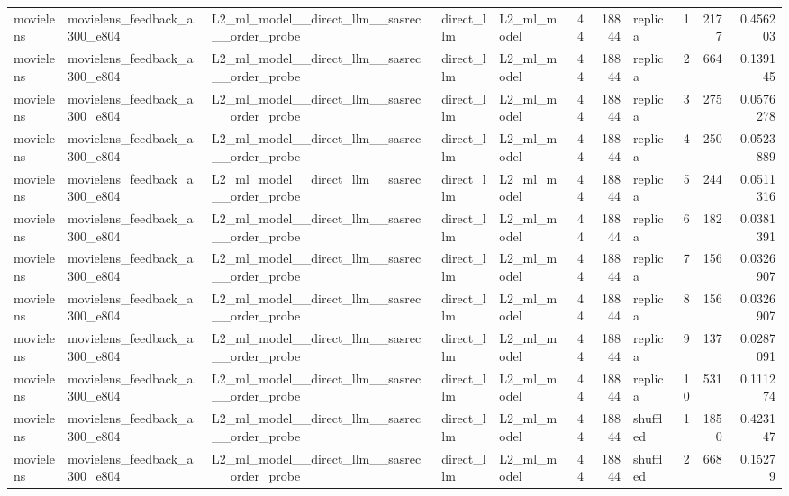 \begin{table}[htbp!]
\begin{tabular}{lllllrrlrrr}
movielens & movielens\_feedback\_a300\_e804 & L2\_ml\_model\_\_direct\_llm\_\_sasrec\_\_order\_probe & direct\_llm & L2\_ml\_model & 44 & 18844 & replica & 1 & 2177 & 0.456203 \\
movielens & movielens\_feedback\_a300\_e804 & L2\_ml\_model\_\_direct\_llm\_\_sasrec\_\_order\_probe & direct\_llm & L2\_ml\_model & 44 & 18844 & replica & 2 & 664 & 0.139145 \\
movielens & movielens\_feedback\_a300\_e804 & L2\_ml\_model\_\_direct\_llm\_\_sasrec\_\_order\_probe & direct\_llm & L2\_ml\_model & 44 & 18844 & replica & 3 & 275 & 0.0576278 \\
movielens & movielens\_feedback\_a300\_e804 & L2\_ml\_model\_\_direct\_llm\_\_sasrec\_\_order\_probe & direct\_llm & L2\_ml\_model & 44 & 18844 & replica & 4 & 250 & 0.0523889 \\
movielens & movielens\_feedback\_a300\_e804 & L2\_ml\_model\_\_direct\_llm\_\_sasrec\_\_order\_probe & direct\_llm & L2\_ml\_model & 44 & 18844 & replica & 5 & 244 & 0.0511316 \\
movielens & movielens\_feedback\_a300\_e804 & L2\_ml\_model\_\_direct\_llm\_\_sasrec\_\_order\_probe & direct\_llm & L2\_ml\_model & 44 & 18844 & replica & 6 & 182 & 0.0381391 \\
movielens & movielens\_feedback\_a300\_e804 & L2\_ml\_model\_\_direct\_llm\_\_sasrec\_\_order\_probe & direct\_llm & L2\_ml\_model & 44 & 18844 & replica & 7 & 156 & 0.0326907 \\
movielens & movielens\_feedback\_a300\_e804 & L2\_ml\_model\_\_direct\_llm\_\_sasrec\_\_order\_probe & direct\_llm & L2\_ml\_model & 44 & 18844 & replica & 8 & 156 & 0.0326907 \\
movielens & movielens\_feedback\_a300\_e804 & L2\_ml\_model\_\_direct\_llm\_\_sasrec\_\_order\_probe & direct\_llm & L2\_ml\_model & 44 & 18844 & replica & 9 & 137 & 0.0287091 \\
movielens & movielens\_feedback\_a300\_e804 & L2\_ml\_model\_\_direct\_llm\_\_sasrec\_\_order\_probe & direct\_llm & L2\_ml\_model & 44 & 18844 & replica & 10 & 531 & 0.111274 \\
movielens & movielens\_feedback\_a300\_e804 & L2\_ml\_model\_\_direct\_llm\_\_sasrec\_\_order\_probe & direct\_llm & L2\_ml\_model & 44 & 18844 & shuffled & 1 & 1850 & 0.423147 \\
movielens & movielens\_feedback\_a300\_e804 & L2\_ml\_model\_\_direct\_llm\_\_sasrec\_\_order\_probe & direct\_llm & L2\_ml\_model & 44 & 18844 & shuffled & 2 & 668 & 0.15279 \\

\end{tabular}
\end{table}
